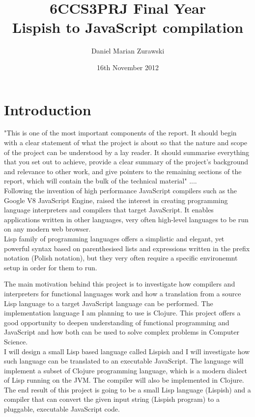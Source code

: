 \documentclass[11pt]{informatics-report}
\title{6CCS3PRJ Final Year\\\vspace{0.2cm}Lispish to JavaScript compilation}
\author{Daniel Marian Zurawski}
\date{16th November 2012}
\begin{document}
\createFrontMatter
\onehalfspacing
\tableofcontents
\doublespacing


\chapter{Introduction}
"This is one of the most important components of the report. It should begin with a clear statement of what the project is about so that the nature and scope of the project can be understood by a lay reader. It should summarise everything that you set out to achieve, provide a clear summary of the project's background and relevance to other work, and give pointers to the remaining sections of the report, which will contain the bulk of the technical material"  .... \\
Following the invention of high performance JavaScript compilers such as the Google V8 JavaScript Engine, raised the interest in creating programming language interpreters and compilers that target JavaScript. It enables applications written in other languages, very often high-level languages to be run on any modern web browser. \\

Lisp family of programming languages offers a simplistic and elegant, yet powerful syntax based on parenthesised lists and expressions written in the prefix notation (Polish notation), but they very often require a specific environemnt setup in order for them to run. 

The main motivation behind this project is to investigate how compilers and interpreters for functional languages work and how a translation from a source Lisp language to a target JavaScript language can be performed. The implementation language I am planning to use is Clojure. This project offers a good opportunity to deepen understanding of functional programming and JavaScript and how both can be used to solve complex problems in Computer Science. 
\\
I will design a small Lisp based language called Lispish and I will investigate how such language can be translated to an executable JavaScript. The language will implement a subset of Clojure programming language, which is a modern dialect of Lisp running on the JVM. The compiler will also be implemented in Clojure.
The end result of this project is going to be a small Lisp language (Lispish) and a compiler that can convert the given input string (Lispish program) to a pluggable, executable JavaScript code.
\end{document}
